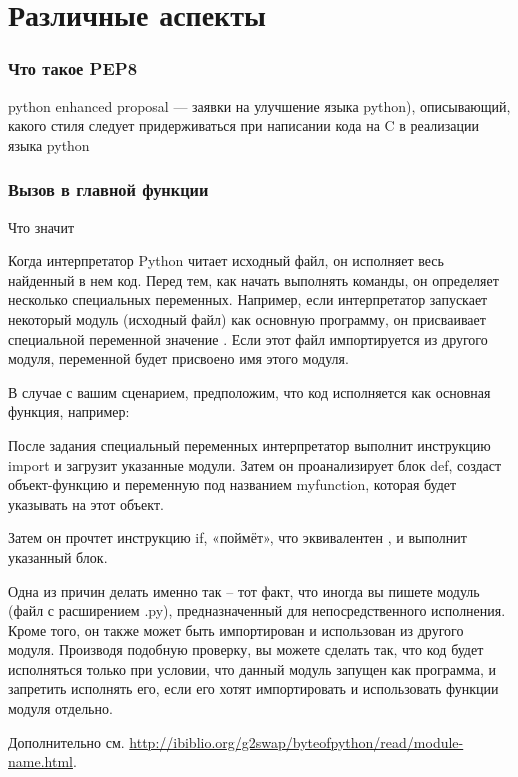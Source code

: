 \part{Различные аспекты}

\section{Что такое PEP8}

python enhanced proposal — заявки на улучшение языка python), описывающий, какого стиля следует придерживаться при написании кода на C в реализации языка python

\section{Вызов в главной функции}
Что значит 

Когда интерпретатор Python читает исходный файл, он исполняет весь найденный в нем код. Перед тем, как начать выполнять команды, он определяет несколько специальных переменных. Например, если интерпретатор запускает некоторый модуль (исходный файл) как основную программу, он присваивает специальной переменной  значение . Если этот файл импортируется из другого модуля, переменной  будет присвоено имя этого модуля.

В случае с вашим сценарием, предположим, что код исполняется как основная функция, например:


После задания специальный переменных интерпретатор выполнит инструкцию import и загрузит указанные модули. Затем он проанализирует блок def, создаст объект-функцию и переменную под названием myfunction, которая будет указывать на этот объект.

Затем он прочтет инструкцию if, «поймёт», что  эквивалентен , и выполнит указанный блок.

Одна из причин делать именно так – тот факт, что иногда вы пишете модуль (файл с расширением .py), предназначенный для непосредственного исполнения. Кроме того, он также может быть импортирован и использован из другого модуля. Производя подобную проверку, вы можете сделать так, что код будет исполняться только при условии, что данный модуль запущен как программа, и запретить исполнять его, если его хотят импортировать и использовать функции модуля отдельно.

Дополнительно см. \url{http://ibiblio.org/g2swap/byteofpython/read/module-name.html}.

